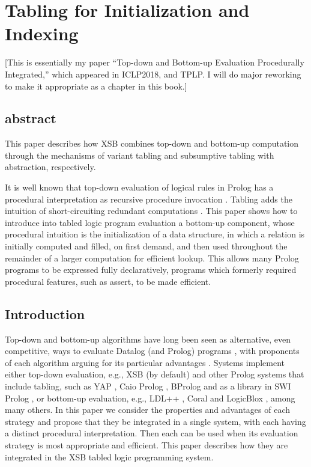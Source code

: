 \chapter{Tabling for Initialization and Indexing}

[This is essentially my paper ``Top-down and Bottom-up Evaluation
  Procedurally Integrated,'' which appeared in ICLP2018, and TPLP.  I
  will do major reworking to make it appropriate as a chapter in this
  book.]

\section{abstract}
This paper describes how XSB combines top-down and bottom-up
computation through the mechanisms of variant tabling and subsumptive
tabling with abstraction, respectively.

It is well known that top-down evaluation of logical rules in Prolog
has a procedural interpretation as recursive procedure invocation
\cite{Kowalski:1986:LP:13060}.  Tabling adds the intuition of
short-circuiting redundant computations \cite{memoing:warren}.  This
paper shows how to introduce into tabled logic program evaluation a
bottom-up component, whose procedural intuition is the initialization
of a data structure, in which a relation is initially computed and
filled, on first demand, and then used throughout the remainder of a
larger computation for efficient lookup.  This allows many Prolog
programs to be expressed fully declaratively, programs which formerly
required procedural features, such as assert, to be made efficient.
%
%
\section{Introduction}
Top-down and bottom-up algorithms have long been seen as alternative,
even competitive, ways to evaluate Datalog (and Prolog) programs
\cite{Lloyd:1993:FLP:529834,bry-reconciled}, with proponents of each
algorithm arguing for its particular advantages
\cite{Ullman:1989:BBT:73721.73736,Toman95top-downbeats,Tekle:2011:MED:1989323.1989393}.
Systems implement either top-down evaluation, e.g., XSB (by default)
\cite{xsbprolog:tplp} and other Prolog systems that include tabling,
such as YAP \cite{DBLP:journals/tplp/CostaRD12}, Caio Prolog
\cite{DBLP:journals/tplp/HermenegildoBCLMMP12}, BProlog
\cite{DBLP:journals/tplp/Zhou12} and as a library in SWI Prolog
\cite{SWI-tabling}, or bottom-up evaluation, e.g., LDL++
\cite{LDLplusplus}, Coral \cite{DBLP:journals/vldb/RamakrishnanSSS94}
and LogicBlox \cite{Aref:2015:DIL:2723372.2742796}, among many others.
In this paper we consider the properties and advantages of each
strategy and propose that they be integrated in a single
system, with each having a distinct procedural interpretation.  Then
each can be used when its evaluation strategy is most appropriate and
efficient.  This paper describes how they are integrated in the XSB
tabled logic programming system.

